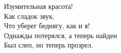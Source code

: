 Изумительная красота!\\
Как сладок звук,\\
Что уберег беднягу, как и я!\\
Однажды потерялся,
а теперь найден\\
Был слеп, но теперь прозрел.\\
